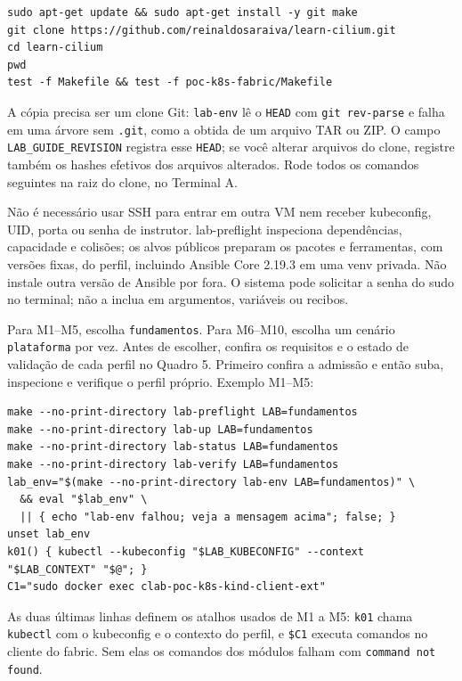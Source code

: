 \documentclass[12pt,openany,oneside,a4paper,chapter=TITLE,english,brazil]{abntex2}
\begin{document}
\begin{verbatim}
sudo apt-get update && sudo apt-get install -y git make
git clone https://github.com/reinaldosaraiva/learn-cilium.git
cd learn-cilium
pwd
test -f Makefile && test -f poc-k8s-fabric/Makefile
\end{verbatim}

A cópia precisa ser um clone Git: \texttt{lab-{}\allowbreak{}env} lê o \texttt{HEAD} com \texttt{git rev-{}\allowbreak{}parse} e
falha em uma árvore sem \texttt{.\allowbreak{}git}, como a obtida de um arquivo TAR ou ZIP. O campo
\texttt{LAB\_\allowbreak{}GUIDE\_\allowbreak{}REVISION} registra esse \texttt{HEAD}; se você alterar arquivos do clone,
registre também os hashes efetivos dos arquivos alterados. Rode todos os
comandos seguintes na raiz do clone, no Terminal A.

Não é necessário usar SSH para entrar em outra VM nem receber kubeconfig, UID,
porta ou senha de instrutor. lab-preflight inspeciona dependências, capacidade
e colisões; os alvos públicos preparam os pacotes e ferramentas, com versões fixas, do
perfil, incluindo Ansible Core 2.19.3 em uma venv privada. Não instale outra
versão de Ansible por fora. O sistema pode solicitar a senha do sudo no
terminal; não a inclua em argumentos, variáveis ou recibos.

Para M1--M5, escolha \texttt{fundamentos}. Para M6--M10, escolha um cenário \texttt{plataforma}
por vez. Antes de escolher, confira os requisitos e o estado de validação de
cada perfil no Quadro 5. Primeiro confira a admissão e então suba, inspecione
e verifique o perfil próprio. Exemplo M1--M5:

\begin{verbatim}
make --no-print-directory lab-preflight LAB=fundamentos
make --no-print-directory lab-up LAB=fundamentos
make --no-print-directory lab-status LAB=fundamentos
make --no-print-directory lab-verify LAB=fundamentos
lab_env="$(make --no-print-directory lab-env LAB=fundamentos)" \
  && eval "$lab_env" \
  || { echo "lab-env falhou; veja a mensagem acima"; false; }
unset lab_env
k01() { kubectl --kubeconfig "$LAB_KUBECONFIG" --context "$LAB_CONTEXT" "$@"; }
C1="sudo docker exec clab-poc-k8s-kind-client-ext"
\end{verbatim}

As duas últimas linhas definem os atalhos usados de M1 a M5: \texttt{k01} chama
\texttt{kubectl} com o kubeconfig e o contexto do perfil, e \texttt{\$C1} executa comandos no
cliente do fabric. Sem elas os comandos dos módulos falham com
\texttt{command not found}.
\end{document}
